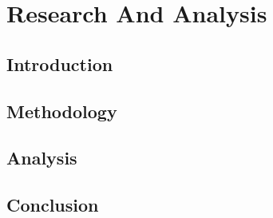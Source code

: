 \chapter{Research And Analysis}

\section{Introduction}

\section{Methodology}

\section{Analysis}

\section{Conclusion}